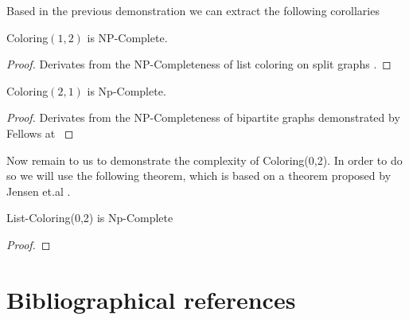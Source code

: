 \documentclass[9pt]{../document-types/entcs} \usepackage{../document-types/entcsmacro}
\begin{document}
Based in the previous demonstration we can extract the following corollaries

\begin{corollary}
  {\sc Coloring$(1,2)$} is NP-Complete.
\end{corollary}
\begin{proof}
  Derivates from the NP-Completeness of list coloring on split graphs \cite{jansen1997}.
\end{proof}

\begin{corollary}
  {\sc Coloring$(2,1)$ is Np-Complete.}
\end{corollary}
\begin{proof}
  Derivates from the NP-Completeness of bipartite graphs demonstrated by Fellows at \cite{fellows07}
\end{proof}

Now remain to us to demonstrate the complexity of {\sc Coloring(0,2)}. In order to do so we will use the following theorem, which is based on a theorem proposed by Jensen et.al \cite{jansen1999}. 

\begin{theorem} 
  {\sc List-Coloring(0,2) is Np-Complete}
\end{theorem}

\begin{proof}
\end{proof}
\section{Bibliographical references}\label{references}

\begin{thebibliography}{10}\label{bibliography}

\end{thebibliography}
\end{document}
